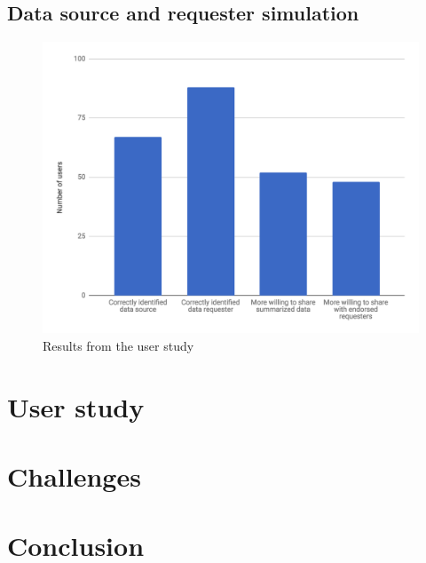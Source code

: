 \documentclass[conference]{IEEEtran}
\begin{document}
\subsection{Data source and requester simulation}


\begin{figure}[t]
	\includegraphics[width=0.95\linewidth]{user_study.png}
	\caption{Results from the user study}
	\label{fig:user_study}
\end{figure}
\section{User study}


\section{Challenges}


\section{Conclusion}


\begin{thebibliography}{00}

\end{thebibliography}
\end{document}
